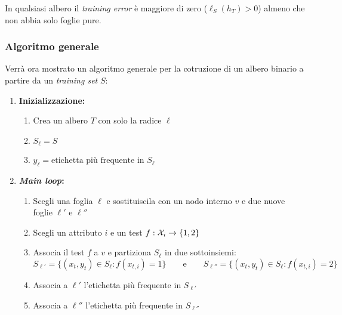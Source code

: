 In qualsiasi albero il \textit{training error} è maggiore di zero ($\ell_S(h_T)>0$)
almeno che non abbia solo foglie pure.

\subsubsection{Algoritmo generale}
Verrà ora mostrato un algoritmo generale per la cotruzione di un albero binario a partire
da un \textit{training set} $S$:

\begin{enumerate}
    \item \textbf{Inizializzazione:}
        \begin{enumerate}
            \item Crea un albero $T$ con solo la radice $\ell$
            \item $S_{\ell} = S$
            \item $y_{\ell} = \text{etichetta più frequente in $S_{\ell}$}$
        \end{enumerate}
    \item \textbf{\textit{Main loop}:}
        \begin{enumerate}
            \item Scegli una foglia $\ell$ e sostituiscila con un nodo interno $v$ e due
                nuove foglie $\ell'$ e $\ell''$
            \item Scegli un attributo $i$ e un test $f:\mathcal{X}_i \rightarrow \{1,2\}$
            \item Associa il test $f$ a $v$ e partiziona $S_{\ell}$ in due sottoinsiemi:
                $$ S_{\ell'}=\{(x_t,y_t) \in S_{\ell} : f(x_{t,i})=1\} \qquad \text{e} 
                \qquad S_{\ell''}=\{(x_t,y_t) \in S_{\ell} : f(x_{t,i})=2\} $$
            \item Associa a $\ell'$ l'etichetta più frequente in $S_{\ell'}$
            \item Associa a $\ell''$ l'etichetta più frequente in $S_{\ell''}$
        \end{enumerate}
\end{enumerate}